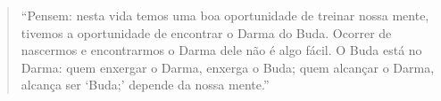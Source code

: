 

\cleartoverso

\begin{quote}
“Pensem: nesta vida temos uma boa oportunidade de treinar nossa mente,
tivemos a oportunidade de encontrar o Darma do Buda. Ocorrer de
nascermos e encontrarmos o Darma dele não é algo fácil. O Buda está no
Darma: quem enxergar o Darma, enxerga o Buda; quem alcançar o Darma,
alcança ser ‘Buda;’ depende da nossa mente.”
\end{quote}

